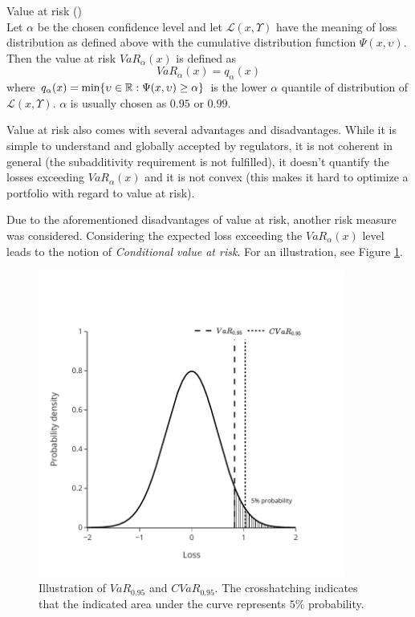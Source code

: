 \begin{defn}{\normalfont Value at risk (\cite[p. 275]{cornuejols_tutuncu_2006})}  \\
Let $\alpha$ be the chosen confidence level and let $\mathcal{L}(x,\Upsilon)$ have the meaning of loss distribution as defined above with the cumulative distribution function $\Psi(x,\upsilon)$. Then the value at risk $VaR_{\alpha}(x)$ is defined as
\begin{equation*}
VaR_{\alpha}(x)=q_{\alpha}(x)
\end{equation*}
where $q_{\alpha}(x)=\mathrm{min}\{\upsilon \in \mathbb{R}: \Psi(x,\upsilon) \geq \alpha \}$ is the lower $\alpha$ quantile of distribution of $\mathcal{L}(x,\Upsilon)$. $\alpha$ is usually chosen as $0.95$ or $0.99$.
\end{defn}




Value at risk also comes with several advantages and disadvantages. While it is simple to understand and globally accepted by regulators, it is not coherent in general (the subadditivity requirement is not fulfilled), it doesn't quantify the losses exceeding $VaR_{\alpha}(x)$ and it is not convex (this makes it hard to optimize a portfolio with regard to value at risk).

Due to the aforementioned disadvantages of value at risk, another risk measure was considered.
Considering the expected loss exceeding the $VaR_{\alpha}(x)$ level leads to the notion of \textit{Conditional value at risk}. For an illustration, see Figure \ref{fig:VaR_CVaR_graph_theory}.

\begin{figure}[H]
	\centering
  \includegraphics[width=0.9\textwidth, height=0.7\textwidth]{../img/var_cvar_plot.pdf}
  \caption{Illustration of $VaR_{0.95}$ and $CVaR_{0.95}$. The crosshatching indicates that the indicated area under the curve represents $5\%$ probability.}
  \label{fig:VaR_CVaR_graph_theory}
\end{figure}

